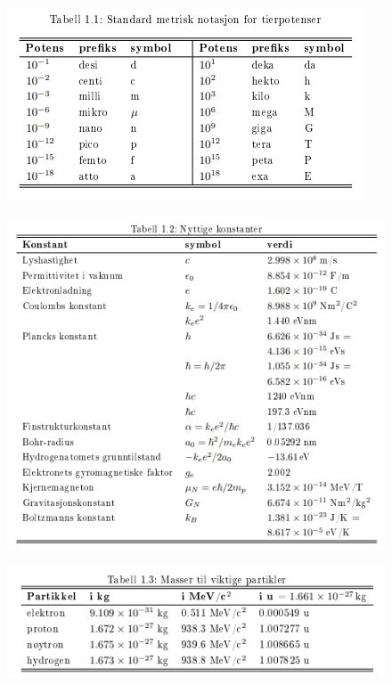 \begin{figure}[ht!]
  \centering
  \includegraphics[scale = 1]{Figures/Metric power notation .png}
  \caption{}
  \label{fig: Metric power notation}
\end{figure}

\begin{figure}[ht!]
  \centering
  \includegraphics[scale = 1]{Figures/Constants table.png}
  \caption{}
  \label{fig: Constants table}
\end{figure}

\begin{figure}[ht!]
  \centering
  \includegraphics[scale = 1]{Figures/Masser til viktige partikler.png}
  \caption{}
  \label{fig: Masser til viktige partikler}
\end{figure}

